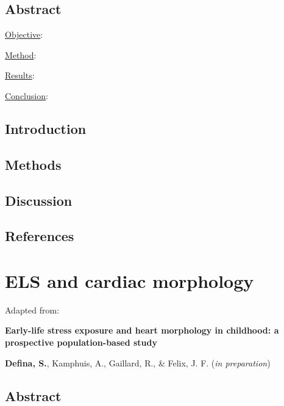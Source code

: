\documentclass[
  letterpaper,
  DIV=11,
  numbers=noendperiod]{scrreport}
\begin{document}
\section*{Abstract}\label{abstract-2}


\ul{Objective}:

\ul{Method}:

\ul{Results}:

\ul{Conclusion}:

\newpage

\section{Introduction}\label{introduction-2}

\section{Methods}\label{methods-2}

\section{Discussion}\label{discussion-2}

\section*{References}\label{references-3}


\chapter{ELS and cardiac morphology}\label{sec-chapter5}

Adapted from:

\textbf{Early-life stress exposure and heart morphology in childhood: a
prospective population-based study}

\textbf{Defina, S.}, Kamphuis, A., Gaillard, R., \& Felix, J. F.
(\emph{in preparation})

\section*{Abstract}\label{abstract-3}

\end{document}
